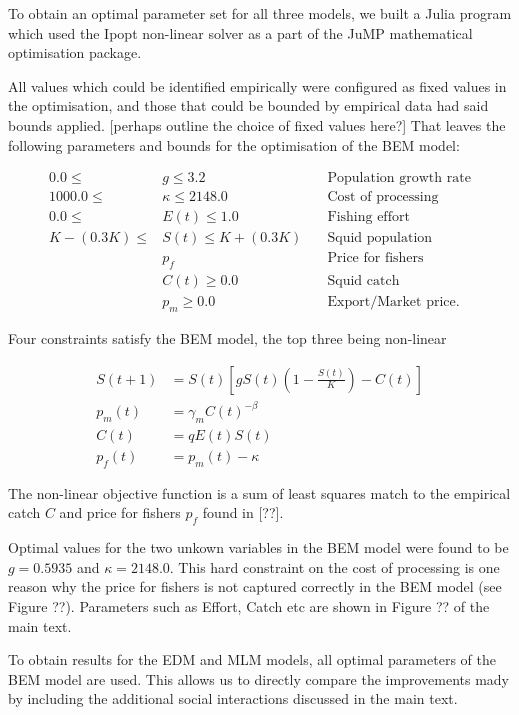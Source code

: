 \documentclass{article}
\begin{document}
To obtain an optimal parameter set for all three models, we built a Julia \cite{Bezanson2017} program which used the Ipopt \cite{Wachter2006} non-linear solver as a part of the JuMP \cite{Dunning2017} mathematical optimisation package.

All values which could be identified empirically were configured as fixed values in the optimisation, and those that could be bounded by empirical data had said bounds applied.
[perhaps outline the choice of fixed values here?]
That leaves the following parameters and bounds for the optimisation of the BEM model:

\begin{align*}
    0.0 \leq &g \leq 3.2 \quad &\text{Population growth rate}\\
    1000.0 \leq &\kappa \leq 2148.0 \quad &\text{Cost of processing}\\
    0.0 \leq &E(t) \leq 1.0 \quad &\text{Fishing effort}\\
    K-(0.3K) \leq &S(t) \leq K+(0.3K) \quad&\text{Squid population}\\
    &p_f  \quad &\text{Price for fishers}\\
    &C(t)  \geq 0.0 \quad &\text{Squid catch}\\
    &p_m \geq 0.0 \quad &\text{Export/Market price}.
\end{align*}


Four constraints satisfy the BEM model, the top three being non-linear

\begin{align}
    S(t+1) &= S(t)\left[g S(t)\left(1-\frac{S(t)}{K}\right)-C(t)\right]\\
    p_m(t) &= \gamma_m C(t)^{-\beta}\\
    C(t) &= qE(t)S(t)\\
    p_f(t) &= p_m(t)-\kappa
\end{align}

The non-linear objective function is a sum of least squares match to the empirical catch $C$ and price for fishers $p_f$ found in [??].

Optimal values for the two unkown variables in the BEM model were found to be $g = 0.5935$ and $\kappa = 2148.0$.
This hard constraint on the cost of processing is one reason why the price for fishers is not captured correctly in the BEM model (see Figure ??).
Parameters such as Effort, Catch etc are shown in Figure ?? of the main text.

To obtain results for the EDM and MLM models, all optimal parameters of the BEM model are used.
This allows us to directly compare the improvements mady by including the additional social interactions discussed in the main text.


\newpage



\end{document}
